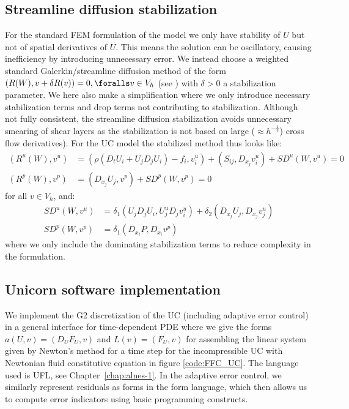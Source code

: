 \subsection{Streamline diffusion stabilization}

For the standard FEM formulation of the model we only have stability
of $U$ but not of spatial derivatives of $U$. This means the solution
can be oscillatory, causing inefficiency by introducing unnecessary
error. We instead choose a weighted standard Galerkin/streamline
diffusion method of the form $(R(W), v + \delta R(v)) = 0, \foralls v
\in V_h$ (see \citet{ErikssonEstepHansboEtAl1996}) with $\delta > 0$ a
stabilization parameter. We here also make a simplification where we only
introduce necessary stabilization terms and drop terms not contributing to
stabilization. Although not fully consistent, the streamline diffusion
stabilization avoids unnecessary smearing of shear layers as the
stabilization is not based on large ($\approx h^{-\frac{1}{2}}$) cross
flow derivatives). For the UC model the stabilized method thus looks like:
\begin{align}
  (R^u(W), v^u) &= (\rho(D_t U_i + U_j D_j U_i) - f_i, v^u_i) + (S_{ij}, D_{x_j} v^u_i) + SD^u(W, v^u) = 0\\
  (R^p(W), v^p) &= (D_{x_j} U_j, v^p) + SD^p(W, v^p) = 0
\end{align}
for all $v \in V_h$, and:
\begin{align}
  SD^u(W, v^u) &= \delta_1 (U_j D_j U_i, U^u_j D_j v^u_i) +
  \delta_2 (D_{x_j} U_j, D_{x_j} v^u_j)\\
  SD^p(W, v^p) &= \delta_1 (D_{x_i} P, D_{x_i} v^p)
\end{align}
where we only include the dominating stabilization terms to reduce
complexity in the formulation.

\subsection{Unicorn software implementation}

We implement the G2 discretization of the UC (including adaptive
error control) in a general interface for time-dependent PDE where
we give the forms $a(U, v) = (D_U F_U, v)$ and $L(v) = (F_U, v)$
for assembling the linear system given by Newton's method for a time
step for the incompressible UC with Newtonian fluid constitutive
equation in figure \ref{code:FFC_UC}. The language used is UFL, see
Chapter~\ref{chap:alnes-1}. In the adaptive error control, we similarly
represent residuals as forms in the form language, which then allows us
to compute error indicators using basic programming constructs.

